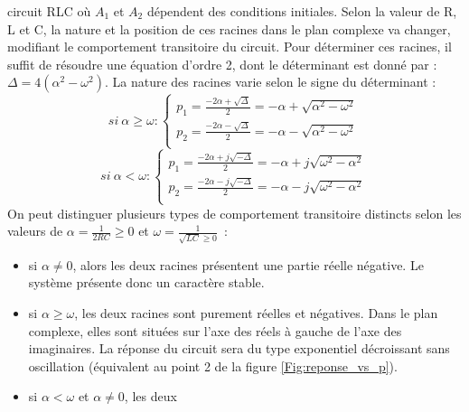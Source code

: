 \begin{remark}{}
\begin{exemple}{circuit RLC}
          où $A_{1}$ et $A_{2}$ dépendent des conditions
          initiales. Selon la valeur de R, L et C, la nature et la
          position de ces racines dans le plan complexe va changer, modifiant
          le comportement transitoire du circuit. Pour déterminer ces
          racines, il suffit de résoudre une équation d'ordre 2, dont le
          déterminant est donné par :
          $\Delta = 4(\alpha^{2}-\omega^{2})$. La nature des racines
          varie selon le signe du déterminant :
          \begin{equation}
            si~\alpha \geq \omega : \left \{
              \begin{array}{l}
                p_{1}=\frac{-2\alpha +\sqrt{\Delta}}{2}=-\alpha+\sqrt{\alpha^{2}-\omega^{2}} \\
                p_{2}=\frac{-2\alpha -\sqrt{\Delta}}{2}=-\alpha-\sqrt{\alpha^{2}-\omega^{2}} \\
              \end{array}
            \right.
          \end{equation}
          \begin{equation}
            si~\alpha < \omega : \left \{
              \begin{array}{l}
                p_{1}=\frac{-2\alpha +j\sqrt{-\Delta}}{2}=-\alpha+j\sqrt{\omega^{2}-\alpha^{2}} \\
                p_{2}=\frac{-2\alpha -j\sqrt{-\Delta}}{2}=-\alpha-j\sqrt{\omega^{2}-\alpha^{2}} \\
              \end{array}
          \right.
	\end{equation}
	On peut distinguer plusieurs types de comportement transitoire
        distincts selon les valeurs de $\alpha=\frac{1}{2RC}\geq 0$ et $\omega=\frac{1}{\sqrt{LC}\geq 0}$~:
	\begin{itemize}
        \item si $\alpha \neq 0$, alors les deux racines présentent
          une partie réelle négative. Le système présente donc un
          caractère stable.
        \item si $\alpha \geq \omega$, les deux racines sont purement
          réelles et négatives. Dans le plan complexe, elles sont situées sur
          l'axe des réels à gauche de l'axe des imaginaires. La
          réponse du circuit sera du type exponentiel décroissant sans
          oscillation (équivalent au point 2 de la figure
          \ref{Fig:reponse_vs_p}).
        \item si $\alpha < \omega$ et $\alpha \neq 0$, les deux

\end{itemize}
\end{exemple}
\end{remark}
